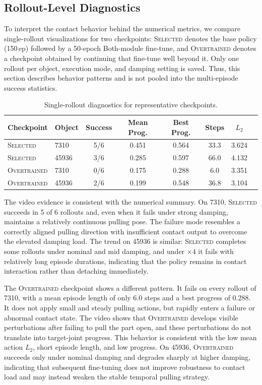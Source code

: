 \subsection{Rollout-Level Diagnostics}
\label{sec:rollout}

To interpret the contact behavior behind the numerical metrics, we
compare single-rollout visualizations for two checkpoints:
\textsc{Selected} denotes the base policy (150\,ep) followed by a
50-epoch Both-module fine-tune, and \textsc{Overtrained} denotes a
checkpoint obtained by continuing that fine-tune well beyond it. Only one rollout per object, execution mode, and damping
setting is saved. Thus, this section describes behavior patterns and
is not pooled into the multi-episode success statistics.

\begin{table}[!htbp]
\centering
\caption{Single-rollout diagnostics for representative checkpoints.}
\label{tab:rollout}
\small
\begin{tabular}{llcccccc}
\toprule
Checkpoint & Object & Success & Mean Prog. & Best Prog. & Steps & $L_2$ \\
\midrule
\textsc{Selected} & 7310  & 5/6 & 0.451 & 0.564 & 33.3 & 3.624 \\
\textsc{Selected} & 45936 & 3/6 & 0.285 & 0.597 & 66.0 & 4.132 \\
\textsc{Overtrained} & 7310  & 0/6 & 0.175 & 0.288 &  6.0 & 3.351 \\
\textsc{Overtrained} & 45936 & 2/6 & 0.199 & 0.548 & 36.8 & 3.104 \\
\bottomrule
\end{tabular}
\end{table}

The video evidence is consistent with the numerical summary. On
7310, \textsc{Selected} succeeds in 5 of 6 rollouts and, even when it
fails under strong damping, maintains a relatively continuous
pulling pose. The failure mode resembles a correctly aligned pulling
direction with insufficient contact output to overcome the elevated
damping load. The trend on 45936 is similar: \textsc{Selected}
completes some rollouts under nominal and mid damping, and under
$\times4$ it fails with relatively long episode durations, indicating
that the policy remains in contact interaction rather than detaching
immediately.

The \textsc{Overtrained} checkpoint shows a different pattern. It fails
on every rollout of 7310, with a mean episode length of only $6.0$
steps and a best progress of $0.288$. It does not apply small and
steady pulling actions, but rapidly enters a failure or abnormal
contact state. The video shows that \textsc{Overtrained} develops
visible perturbations after failing to pull the part open, and these
perturbations do not translate into target-joint progress. This
behavior is consistent with the low mean action $L_2$, short episode
length, and low progress. On 45936, \textsc{Overtrained} succeeds only
under nominal damping and degrades sharply at higher damping,
indicating that subsequent fine-tuning does not improve robustness
to contact load and may instead weaken the stable temporal pulling
strategy.

